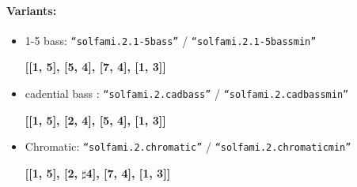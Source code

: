 ﻿\documentclass[11pt, openany]{article}
\begin{document}
\begin{itemize}
\paragraph{Variants:}
\begin{itemize}
\item 1-5 bass: \texttt{“solfami.2.1-5bass”} / \texttt{“solfami.2.1-5bassmin”}
	\begin{center}
	\textbf{[[1, 5], [5, 4], [7, 4], [1, 3]]}
	\end{center}
\item cadential bass : \texttt{“solfami.2.cadbass”} / \texttt{“solfami.2.cadbassmin”}
	\begin{center}
	\textbf{[[1, 5], [2, 4], [5, 4], [1, 3]]}
	\end{center}
\item Chromatic: \texttt{“solfami.2.chromatic”} / \texttt{“solfami.2.chromaticmin”}
	\begin{center}
	\textbf{[[1, 5], [2, $\sharp$4], [7, 4], [1, 3]]}
	\end{center}
\end{itemize}


\end{itemize}
\end{document}
